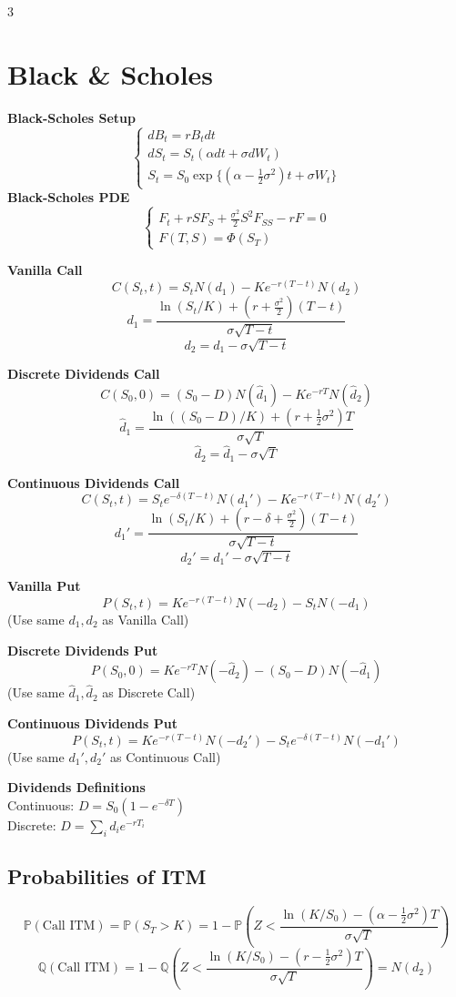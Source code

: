 \documentclass[8pt, a4paper, landscape]{extarticle}
\begin{document}
\begin{multicols*}{3}
\section*{Black \& Scholes}
\textbf{Black-Scholes Setup}
\[
\begin{cases}
    dB_t = r B_t dt \\
    dS_t = S_t (\alpha dt + \sigma dW_t) \\
    S_t = S_0 \exp\{(\alpha - \frac{1}{2}\sigma^2)t + \sigma W_t\}
\end{cases}
\]
\textbf{Black-Scholes PDE}
\[
\begin{cases}
F_t + r S F_S + \frac{\sigma^2}{2} S^2 F_{SS} - r F = 0 \\
F(T, S) = \Phi(S_T)
\end{cases}
\]

\textbf{Vanilla Call}
\[ C(S_t, t) = S_t N(d_1) - K e^{-r(T-t)} N(d_2) \]
\[ d_1 = \frac{\ln(S_t/K) + (r + \frac{\sigma^2}{2})(T-t)}{\sigma\sqrt{T-t}} \]
\[ d_2 = d_1 - \sigma\sqrt{T-t} \]

\textbf{Discrete Dividends Call}
\[ C(S_0, 0) = (S_0 - D) N(\hat{d}_1) - K e^{-rT} N(\hat{d}_2) \]
\[ \hat{d}_1 = \frac{\ln((S_0-D)/K) + (r + \frac{1}{2}\sigma^2)T}{\sigma\sqrt{T}} \]
\[ \hat{d}_2 = \hat{d}_1 - \sigma\sqrt{T} \]

\textbf{Continuous Dividends Call}
\[ C(S_t, t) = S_t e^{-\delta(T-t)} N(d_1') - K e^{-r(T-t)} N(d_2') \]
\[ d_1' = \frac{\ln(S_t/K) + (r - \delta + \frac{\sigma^2}{2})(T-t)}{\sigma\sqrt{T-t}} \]
\[ d_2' = d_1' - \sigma\sqrt{T-t} \]

\textbf{Vanilla Put}
\[ P(S_t, t) = K e^{-r(T-t)} N(-d_2) - S_t N(-d_1) \]
(Use same $d_1, d_2$ as Vanilla Call)

\textbf{Discrete Dividends Put}
\[ P(S_0, 0) = K e^{-rT} N(-\hat{d}_2) - (S_0 - D) N(-\hat{d}_1) \]
(Use same $\hat{d}_1, \hat{d}_2$ as Discrete Call)

\textbf{Continuous Dividends Put}
\[ P(S_t, t) = K e^{-r(T-t)} N(-d_2') - S_t e^{-\delta(T-t)} N(-d_1') \]
(Use same $d_1', d_2'$ as Continuous Call)

\textbf{Dividends Definitions} \\
Continuous: $D = S_0(1-e^{-\delta T})$ \\
Discrete: $D = \sum_i d_i e^{-rT_i}$

\subsection*{Probabilities of ITM}
\[ \mathbb{P}(\text{Call ITM}) = \mathbb{P}(S_T > K) = 1 - \mathbb{P}\left(Z < \frac{\ln(K/S_0) - (\alpha - \frac{1}{2}\sigma^2)T}{\sigma\sqrt{T}}\right) \]
\[ \mathbb{Q}(\text{Call ITM}) = 1 - \mathbb{Q}\left(Z < \frac{\ln(K/S_0) - (r - \frac{1}{2}\sigma^2)T}{\sigma\sqrt{T}}\right) = N(d_2) \]


\end{multicols*}
\end{document}
